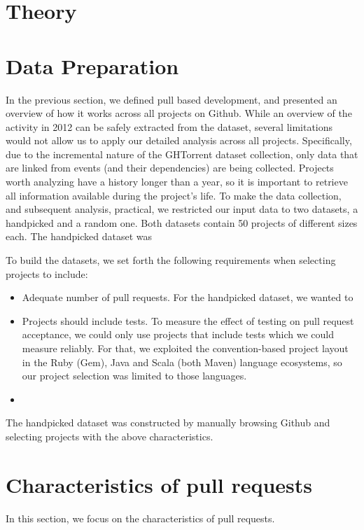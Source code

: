 \documentclass{sig-alternate}
\begin{document}
\section{Theory}

\section{Data Preparation}

In the previous section, we defined pull based development, and presented an
overview of how it works across all projects on Github. While an overview of the
activity in 2012 can be safely extracted from the dataset, several limitations
would not allow us to apply our detailed analysis across all projects.
Specifically, due to the incremental nature of the GHTorrent dataset collection,
only data that are linked from events (and their dependencies) are being
collected. Projects worth analyzing have a history longer than a year, so it is
important to retrieve all information available during the project's life. To
make the data collection, and subsequent analysis, practical, we restricted our
input data to two datasets, a \textsf{handpicked} and a \textsf{random} one. 
Both datasets contain 50 projects of different sizes each. The 
\textsf{handpicked} dataset was 


To build the datasets, we set forth the following requirements when selecting
projects to include:

\begin{itemize}

  \item Adequate number of pull requests. For the \textsf{handpicked} dataset,
    we wanted to 

  \item Projects should include tests. To measure the effect of testing on pull
    request acceptance, we could only use projects that include tests which we
    could measure reliably. For that, we exploited the convention-based project
    layout in the Ruby (Gem), Java and Scala (both Maven) language ecosystems,
    so our project selection was limited to those languages. 

  \item 

\end{itemize}

The \textsf{handpicked} dataset was constructed by manually browsing Github
and selecting projects with the above characteristics.  

\section{Characteristics of pull requests}
In this section, we focus on the characteristics of pull requests. 
\end{document}
